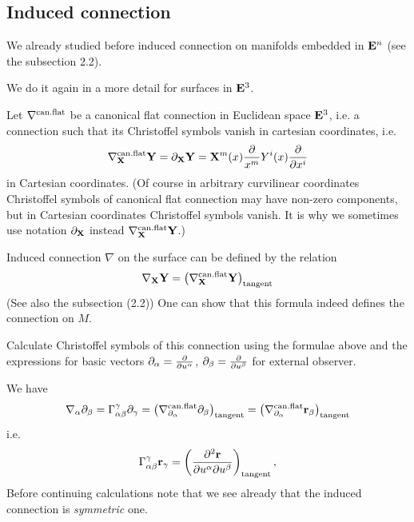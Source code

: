 \documentclass[12pt]{article}
\theoremstyle{theorem}
\numberwithin{equation}{section}
\begin{document}
  \subsection {Induced connection}

  We already studied before induced connection on manifolds embedded in ${\bf E}^n$ (see the subsection 2.2).

  We do it again in a more detail for  surfaces in ${\bf E}^3$.

Let $\nabla^{\rm can.flat}$ be a canonical flat connection in Euclidean space ${\bf E}^3$, i.e. a connection such
that its  Christoffel symbols vanish in cartesian coordinates, i.e.
\begin{equation}\label{canonicalflatconnection}
    \nabla^{\rm can.flat}_{\bf X} {\bf Y}= \partial_{\bf X} {\bf Y}= {\bf X}^m(x){\partial \over x^m}Y^i(x){\partial\over \partial x^i}
\end{equation}
in  Cartesian coordinates. (Of course in arbitrary curvilinear coordinates Christoffel symbols
of canonical flat connection may have non-zero components, but in Cartesian coordinates Christoffel symbols vanish.
It is why we sometimes use notation  $\partial_{\bf X}$ instead $\nabla^{\rm can.flat}_{\bf X} {\bf Y}$.)


   Induced connection $\nabla$ on the surface can be defined by the relation
             \begin{equation}\label{inducedconnection4}
             {\nabla}_{\bf X}{\bf Y}=\left( \nabla^{\rm can.flat}_{\bf X} {\bf Y}\right)_{\rm tangent}
             \end{equation}
          (See also the subsection (2.2))
One can show that this formula indeed defines the connection on $M$.


Calculate Christoffel symbols of this connection using the formulae above and the expressions
for basic vectors $\partial_\alpha={\partial\over \partial u^\alpha}$,  $\partial_\beta={\partial\over \partial u^\beta}$ for external observer.

We have
\begin{equation}\label{christoffelsymbols1forinducedconnection}
\nabla_\alpha\partial_\beta=\Gamma^\gamma_{\alpha\beta}\partial_\gamma=
\left( \nabla^{\rm can.flat}_{\partial_\alpha} {\partial_\beta}\right)_{\rm tangent}=
\left( \nabla^{\rm can.flat}_{\partial_\alpha} {{\bf r}_\beta}\right)_{\rm tangent}
\end{equation}
i.e.
\begin{equation}\label{christoffelsymbols1forinducedconnection2}
 \Gamma^\gamma_{\alpha\beta}{\bf r}_\gamma=\left({\partial^2{\bf r} \over \partial u^\alpha\partial u^\beta}\right)_{\rm tangent},
\end{equation}
Before continuing calculations note that we see already that the induced connection is {\it symmetric} one.
\end{document}
